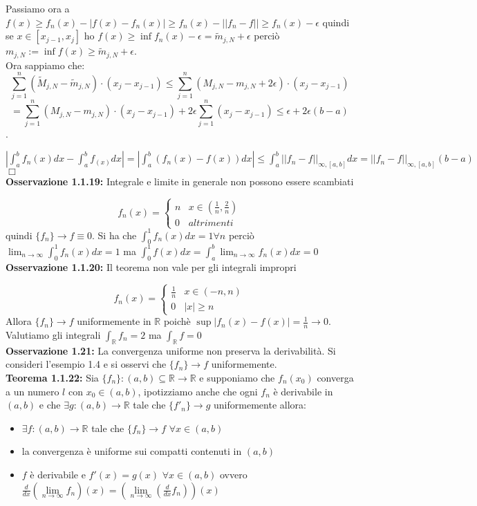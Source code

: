 \documentclass[a4paper,11pt,titlepage]{book}
\begin{document}
Passiamo ora a $f(x)\geq f_{n}(x)-|f(x)-f_{n}(x)|\geq f_{n}(x)-||f_{n}-f|| \geq f_{n}(x)-\epsilon$ quindi se $x\in [x_{j-1},x_{j}] $ ho $f(x) \geq \inf f_{n}(x)-\epsilon=\widetilde{m}_{j,N}+\epsilon$ perciò $m_{j,N}:=\inf f(x)\geq\widetilde{m}_{j,N}+\epsilon$. \\

Ora sappiamo che:
 $$\sum_{j=1}^n (\widetilde{M}_{j,N}-\widetilde{m}_{j,N}) \cdot (x_{j}-x_{j-1})\leq \sum_{j=1}^n (M_{j,N}-m_{j,N}+2\epsilon)\cdot (x_{j}-x_{j-1})$$  $$=\sum_{j=1}^n (M_{j,N}-m_{j,N})\cdot (x_{j}-x_{j-1})+2\epsilon\sum_{j=1}^n(x_{j}-x_{j-1})\leq \epsilon +2\epsilon(b-a)$$.

$|\int_{a}^{b}f_{n}(x)dx-\int_{a}^{b}f_(x)dx|=|\int_{a}^{b}(f_{n}(x)-f(x))dx|\leq\int_{a}^{b}||f_{n}-f||_{\infty,[a,b]}dx=||f_{n}-f||_{\infty,[a,b]}(b-a)$ $\Box$\\

\textbf{Osservazione 1.1.19:} Integrale e limite in generale non possono essere scambiati

$$f_{n}(x)=\begin{cases} n &  x\in (\frac{1}{n},\frac{2}{n}) \\ 0 & altrimenti \end{cases}$$ quindi $\{f_{n}\}\rightarrow f\equiv 0$. Si ha che $\int_{0}^{1}f_{n}(x)dx=1 \forall{n}$ perciò $ \lim_{n \to \infty}\int_{0}^{1}f_{n}(x)dx=1$ ma $\int_{0}^{1}f(x)dx=\int_{a}^{b}\lim_{n \to \infty}{f_{n}(x)}dx=0$ \\

\textbf{Osservazione 1.1.20:} Il teorema non vale per gli integrali impropri

$$f_{n}(x)=\begin{cases} \frac{1}{n} &  x\in (-n,n) \\ 0 & |x|\geq n \end{cases}$$ Allora $\{f_{n}\}\rightarrow f$ uniformemente in $\mathbb{R}$ poichè $\sup |f_{n}(x)-f(x)|=\frac{1}{n} \rightarrow 0$. Valutiamo gli integrali $\int_{ \mathbb{R} }^{}f_{n}=2$ ma $\int_{\mathbb{R}}^{}f=0$\\

\textbf{Osservazione 1.21:} La convergenza uniforme non preserva la derivabilità. Si consideri l'esempio 1.4 e si osservi che  $\{f_{n}\}\rightarrow f$ uniformemente.\\

\textbf{Teorema 1.1.22:} Sia $\{f_{n}\}:(a,b)\subseteq \mathbb{R} \rightarrow\mathbb{R}$ e supponiamo che $f_{n}(x_0)$ converga a un numero $l$ con $x_0\in (a,b)$, ipotizziamo anche che ogni $f_{n}$ è derivabile in $(a,b)$  e che $\exists g:(a,b)\rightarrow\mathbb{R}$ tale che $\{f'_{n}\}\rightarrow g$ uniformemente allora:\begin{itemize}
\item $\exists f:(a,b)\rightarrow\mathbb{R}$ tale che $\{f_{n}\}\rightarrow f$ $\forall{x}\in (a,b)$
\item la convergenza è uniforme sui compatti contenuti in $(a,b)$
\item $f$ è derivabile e $f'(x)=g(x)$ $\forall{x}\in (a,b)$ ovvero $\frac{d}{dx}(\lim\limits_{n \to \infty}f_{n})(x)=(\lim\limits_{n \to \infty}(\frac{d}{dx}f_{n}))(x)$\\
\end{itemize}
\end{document}
